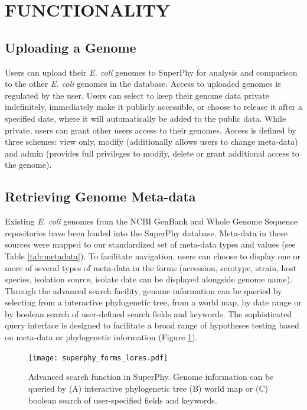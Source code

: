 \documentclass[a4paper,twoside]{article}
\begin{document}
\section{\uppercase{Functionality}}
\label{sec:functionality}

\subsection{Uploading a Genome}

Users can upload their \textit{E. coli} genomes to SuperPhy for analysis and comparison to the other \textit{E. coli} genomes in the database.  Access to uploaded genomes is regulated by the user. Users can select to keep their genome data private indefinitely, immediately make it publicly accessible, or choose to release it after a specified date, where it will automatically be added to the public data.  While private, users can grant other users access to their genomes.  Access is defined by three schemes: view only, modify (additionally allows users to change meta-data) and admin (provides full privileges to modify, delete or grant additional access to the genome).

\subsection{Retrieving Genome Meta-data}

Existing \textit{E. coli} genomes from the NCBI GenBank and Whole Genome Sequence repositories \cite{benson2013genbank} have been loaded into the SuperPhy database. Meta-data in these sources were mapped to our standardized set of meta-data types and values (see Table \ref{tab:metadata}). To facilitate navigation,
users can choose to display one or more of several types of meta-data in the forms (accession, serotype, strain, host species, isolation source, isolate date can be displayed alongside genome name). Through the advanced search facility, genome information can be queried by selecting from a interactive phylogenetic tree, from a world map, by date range or by boolean search of user-defined search fields and keywords.  The sophisticated query interface is designed to facilitate a broad range of hypotheses testing based on meta-data or phylogenetic information (Figure \ref{fig:search}).

\begin{figure}[t]
  \vspace{-0.2cm}
  \centering
   {\texttt{[image: superphy\_forms\_lores.pdf]}}
  \caption{Advanced search function in SuperPhy. Genome information can be queried by (A) interactive phylogenetic tree (B) world map or (C) boolean search of user-specified fields and keywords.}
  \label{fig:search}
\end{figure}
\end{document}
